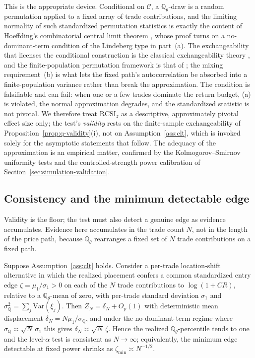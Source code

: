 This is the appropriate device. Conditional on $\mathcal C$, a
$\mathbb{Q}_\theta$-draw is a random permutation applied to a fixed array of trade
contributions, and the limiting normality of such standardized permutation
statistics is exactly the content of Hoeffding's combinatorial central limit
theorem \cite{Hoeffding1951}, whose proof turns on a no-dominant-term condition of
the Lindeberg type in part~(a). The exchangeability that licenses the conditional
construction is the classical exchangeability theory \cite{Aldous1985}, and the
finite-population permutation framework is that of \cite{LehmannRomano2005}; the
mixing requirement~(b) is what lets the fixed path's autocorrelation be absorbed
into a finite-population variance rather than break the approximation. The
condition is falsifiable and can fail: when one or a few trades dominate the
return budget, (a) is violated, the normal approximation degrades, and the
standardized statistic is not pivotal. We therefore treat $\mathrm{RCSI}_z$ as a
descriptive, approximately pivotal effect size only; the test's \emph{validity}
rests on the finite-sample exchangeability of
Proposition~\ref{prop:q-validity}(i), not on Assumption~\ref{ass:clt}, which is
invoked solely for the asymptotic statements that follow. The adequacy of the
approximation is an empirical matter, confirmed by the Kolmogorov--Smirnov
uniformity tests and the controlled-strength power calibration of
Section~\ref{sec:simulation-validation}.

\subsection{Consistency and the minimum detectable edge}
\label{sec:mde}

Validity is the floor; the test must also detect a genuine edge as evidence
accumulates. Evidence here accumulates in the trade count $N$, not in the length
of the price path, because $\mathbb{Q}_\theta$ rearranges a fixed set of $N$
trade contributions on a fixed path.

\begin{proposition}
\label{prop:consistency}
Suppose Assumption~\ref{ass:clt} holds. Consider a per-trade location-shift
alternative in which the realized placement confers a common standardized entry
edge $\zeta=\mu_1/\sigma_1>0$ on each of the $N$ trade contributions to
$\log(1+CR)$, relative to a $\mathbb{Q}_\theta$-mean of zero, with per-trade
standard deviation $\sigma_1$ and $\sigma_{\mathbb Q}^2=\sum_j\mathrm{Var}(\xi_j)$.
Then $Z_N=\delta_N+O_p(1)$ with deterministic mean displacement $\delta_N=
N\mu_1/\sigma_{\mathbb Q}$, and under the no-dominant-term regime where
$\sigma_{\mathbb Q}\asymp\sqrt N\,\sigma_1$ this gives $\delta_N\asymp
\sqrt N\,\zeta$. Hence the realized $\mathbb{Q}_\theta$-percentile tends to one and
the level-$\alpha$ test is consistent as $N\to\infty$; equivalently, the minimum
edge detectable at fixed power shrinks as $\zeta_{\min}\asymp N^{-1/2}$.
\end{proposition}

